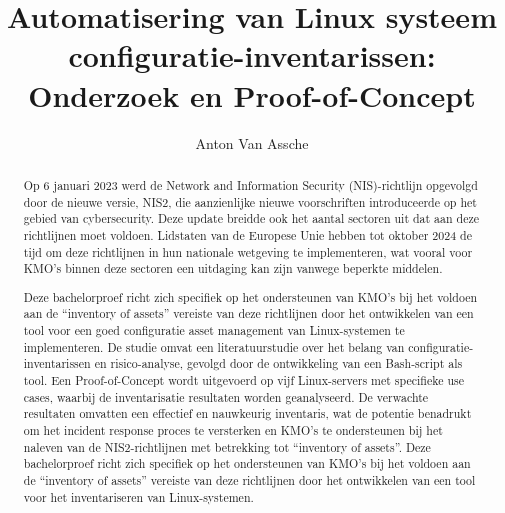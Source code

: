 \documentclass{hogent-article}
\title{Automatisering van Linux systeem configuratie-inventarissen: Onderzoek en Proof-of-Concept}
\author{Anton Van Assche}
\begin{document}
\begin{abstract}
    Op 6 januari 2023 werd de Network and Information Security (NIS)-richtlijn opgevolgd door de nieuwe versie, NIS2, die aanzienlijke nieuwe voorschriften introduceerde op het gebied van cybersecurity.
    Deze update breidde ook het aantal sectoren uit dat aan deze richtlijnen moet voldoen.
    Lidstaten van de Europese Unie hebben tot oktober 2024 de tijd om deze richtlijnen in hun nationale wetgeving te implementeren, wat vooral voor KMO's binnen deze sectoren een uitdaging kan zijn vanwege beperkte middelen.
    \newline

    Deze bachelorproef richt zich specifiek op het ondersteunen van KMO's bij het voldoen aan de ``inventory of assets'' vereiste van deze richtlijnen door het ontwikkelen van een tool voor een goed configuratie asset management van Linux-systemen te implementeren.
    De studie omvat een literatuurstudie over het belang van configuratie-inventarissen en risico-analyse, gevolgd door de ontwikkeling van een Bash-script als tool.
    Een Proof-of-Concept wordt uitgevoerd op vijf Linux-servers met specifieke use cases, waarbij de inventarisatie resultaten worden geanalyseerd.
    De verwachte resultaten omvatten een effectief en nauwkeurig inventaris, wat de potentie benadrukt om het incident response proces te versterken en KMO's te ondersteunen bij het naleven van de NIS2-richtlijnen met betrekking tot ``inventory of assets''.
    Deze bachelorproef richt zich specifiek op het ondersteunen van KMO's bij het voldoen aan de ``inventory of assets'' vereiste van deze richtlijnen door het ontwikkelen van een tool voor het inventariseren van Linux-systemen.
\end{abstract}

\tableofcontents



\printbibliography[heading=bibintoc]
\end{document}
